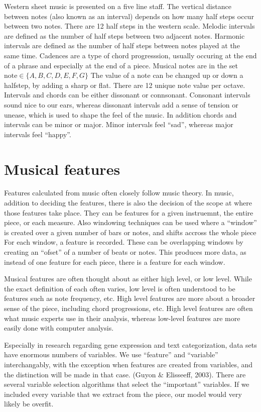 \documentclass[12pt,twoside]{reedthesis}
\theoremstyle{definition}
\theoremstyle{definition}
\theoremstyle{definition}
\theoremstyle{remark}
\begin{document}
Western sheet music is presented on a five line staff. The vertical
distance between notes (also known as an interval) depends on how many
half steps occur between two notes. There are 12 half steps in the
western scale. Melodic intervals are defined as the number of half steps
between two adjacent notes. Harmonic intervals are defined as the number
of half steps between notes played at the same time. Cadences are a type
of chord progresssion, usually occuring at the end of a phrase and
especially at the end of a piece. Musical notes are in the set
\(\text{note} \in \{A,B,C,D,E,F,G\}\) The value of a note can be changed
up or down a halfstep, by adding a sharp or flat. There are 12 unique
note value per octave. Intervals and chords can be either dissonant or
connsonant. Consonant intervals sound nice to our ears, whereas
dissonant intervals add a sense of tension or unease, which is used to
shape the feel of the music. In addition chords and intervals can be
minor or major. Minor intervals feel ``sad'', whereas major intervals
feel ``happy''.

\section{Musical features}\label{musical-features}

Features calculated from music often closely follow music theory. In
music, addition to deciding the features, there is also the decision of
the scope at where those features take place. They can be features for a
given instruemnt, the entire piece, or each measure. Also windowing
techniques can be used where a ``window'' is created over a given number
of bars or notes, and shifts accross the whole piece For each window, a
feature is recorded. These can be overlapping windows by creating an
``ofset'' of a number of beats or notes. This produces more data, as
instead of one feature for each piece, there is a feature for each
window.

Musical features are often thought about as either high level, or low
level. While the exact definition of each often varies, low level is
often understood to be features such as note frequency, etc. High level
features are more about a broader sense of the piece, including chord
progressions, etc. High level features are often what music experts use
in their analysis, whereas low-level features are more easily done with
computer analysis.

Especially in research regarding gene expression and text
categorization, data sets have enormous numbers of variables. We use
``feature'' and ``variable'' interchangably, with the exception when
features are created from variables, and the distinction will be made in
that case. (Guyon \& Elisseeff, 2003). There are several variable
selection algorithms that select the ``important'' variables. If we
included every variable that we extract from the piece, our model would
very likely be overfit.
\end{document}
